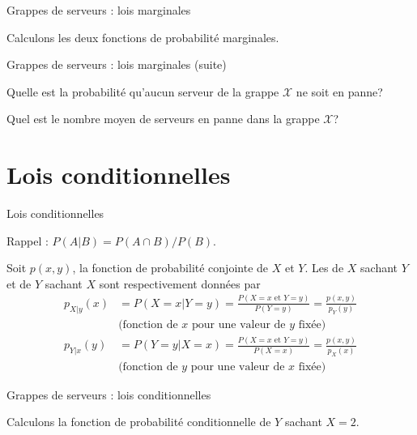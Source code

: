 \documentclass{BeamerTemplate}
\newcommand{\cibleReponse}{}
\newcommand{\lienreponse}[1]{\gdef\cibleReponse{#1}}
\begin{document}
\begin{frame}[t]{Grappes de serveurs : lois marginales}

Calculons les deux fonctions de probabilité marginales.

\lienreponse{rep-ex1}
\end{frame}


\begin{frame}[t]{Grappes de serveurs : lois marginales (suite)}

Quelle est la probabilité qu'aucun serveur de la grappe $\mathcal{X}$ ne soit en panne?

\vspace{1in}
Quel est le nombre moyen de serveurs en panne dans la grappe $\mathcal{X}$?

\lienreponse{rep-ex1}
\end{frame}

\section{Lois conditionnelles}

\begin{frame}[t]{Lois conditionnelles}

{\small Rappel : $P(A|B)=P(A\cap B)/P(B)$.}

 \begin{defn}{}
  Soit $p(x,y)$, la fonction de probabilité conjointe de $X$ et $Y$. Les
   de $X$ sachant $Y$ et de $Y$ sachant $X$
  sont respectivement données par
  \begin{align*}
   p_{X|y}(x)&=P(X=x|Y=y)=\frac{P(X=x\text{\ et\ }Y=y)}{P(Y=y)}
   =\frac{p(x,y)}{p_Y(y)}\\
   & \text{(fonction de $x$ pour une valeur de $y$ fixée)} \\[6pt]
   p_{Y|x}(y)&=P(Y=y|X=x)=\frac{P(X=x\text{\ et\ }Y=y)}{P(X=x)}
   =\frac{p(x,y)}{p_X(x)}\\
     & \text{(fonction de $y$ pour une valeur de $x$ fixée)}
  \end{align*}
 \end{defn}

\end{frame}


\begin{frame}[t,label=excond]{Grappes de serveurs : lois conditionnelles}

Calculons la fonction de probabilité conditionnelle de $Y$ sachant $X=2$.

\lienreponse{rep-ex1}
\end{frame}
\end{document}
